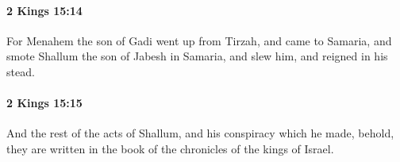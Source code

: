 		\paragraph{2 Kings 15:14} %
			\label{2KINGS-15-14}

			For Menahem the son of Gadi went up from Tirzah, and came to Samaria, and smote Shallum the son of Jabesh in Samaria, and slew him, and reigned in his stead.


		\paragraph{2 Kings 15:15} %
			\label{2KINGS-15-15}

			And the rest of the acts of Shallum, and his conspiracy which he made, behold, they are written in the book of the chronicles of the kings of Israel.


